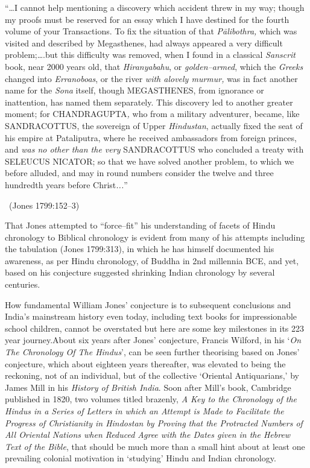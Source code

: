 \begin{myquote}
“…I cannot help mentioning a discovery which accident threw in my way; though my proofs must be reserved for an essay which I have destined for the fourth volume of your Transactions. To fix the situation of that \textit{Pālibothra,} which was visited and described by Megasthenes, had always appeared a very difficult problem;….but this difficulty was removed, when I found in a classical\textit{ Sanscrit} book, near 2000 years old, that \textit{Hiranyabahu}, or \textit{golden–armed}, which the \textit{Greeks} changed into \textit{Erranoboas}, or the river \textit{with a}\textit{lovely murmur,} was in fact another name for the \textit{Sona} itself, though MEGASTHENES, from ignorance or inattention, has named them separately. This discovery led to another greater moment; for CHANDRAGUPTA\textit{,} who from a military adventurer, became, like SANDRACOTTUS, the sovereign of Upper \textit{Hindustan}, actually fixed the seat of his empire at Pataliputra, where he received ambassadors from foreign princes, and \textit{was no other than the very} SANDRACOTTUS who concluded a treaty with SELEUCUS NICATOR; so that we have solved another problem, to which we before alluded, and may in round numbers consider the twelve and three hundredth years before Christ\textit{...}” 

~\hfill (Jones 1799:152–3)
\end{myquote}

That Jones attempted to “force–fit” his understanding of facets of Hindu chronology to Biblical chronology is evident from many of his attempts including the tabulation (Jones 1799:313), in which he has himself documented his awareness, as per Hindu chronology, of Buddha in 2nd millennia BCE, and yet, based on his conjecture suggested shrinking Indian chronology by several centuries.

How fundamental William Jones’ conjecture is to subsequent conclusions and India’s mainstream history even today, including text books for impressionable school children, cannot be overstated but here are some key milestones in its 223 year journey.About six years after Jones’ conjecture, Francis Wilford, in his ‘\textit{On The Chronology Of The Hindus}’, can be seen further theorising based on Jones’ conjecture, which about eighteen years thereafter, was elevated to being the reckoning, not of an individual, but of the collective ‘Oriental Antiquarians,’ by James Mill in his \textit{History of British India}. Soon after Mill’s book, Cambridge published in 1820, two volumes titled brazenly, \textit{A Key to the Chronology of the Hindus in a Series of Letters in which an Attempt is Made to Facilitate the Progress of Christianity in Hindostan by Proving that the Protracted Numbers of All Oriental Nations when Reduced Agree with the Dates given in the Hebrew Text of the Bible}, that should be much more than a small hint about at least one prevailing colonial motivation in ‘studying’ Hindu and Indian chronology.

